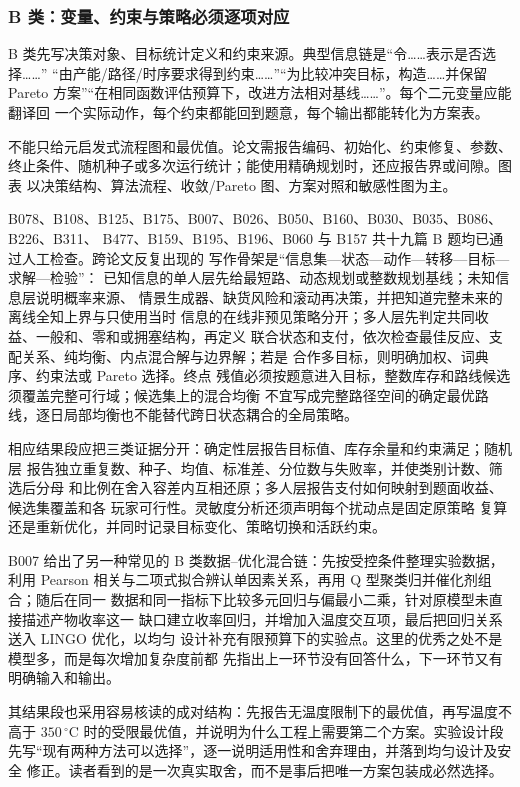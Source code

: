 \subsubsection{B 类：变量、约束与策略必须逐项对应}

B 类先写决策对象、目标统计定义和约束来源。典型信息链是“令……表示是否选择……”
“由产能/路径/时序要求得到约束……”“为比较冲突目标，构造……并保留 Pareto
方案”“在相同函数评估预算下，改进方法相对基线……”。每个二元变量应能翻译回
一个实际动作，每个约束都能回到题意，每个输出都能转化为方案表。

不能只给元启发式流程图和最优值。论文需报告编码、初始化、约束修复、参数、
终止条件、随机种子或多次运行统计；能使用精确规划时，还应报告界或间隙。图表
以决策结构、算法流程、收敛/Pareto 图、方案对照和敏感性图为主。

B078、B108、B125、B175、B007、B026、B050、B160、B030、B035、B086、B226、B311、
B477、B159、B195、B196、B060 与 B157 共十九篇 B 题均已通过人工检查。跨论文反复出现的
写作骨架是“信息集—状态—动作—转移—目标—求解—检验”：
已知信息的单人层先给最短路、动态规划或整数规划基线；未知信息层说明概率来源、
情景生成器、缺货风险和滚动再决策，并把知道完整未来的离线全知上界与只使用当时
信息的在线非预见策略分开；多人层先判定共同收益、一般和、零和或拥塞结构，再定义
联合状态和支付，依次检查最佳反应、支配关系、纯均衡、内点混合解与边界解；若是
合作多目标，则明确加权、词典序、约束法或 Pareto 选择。终点
残值必须按题意进入目标，整数库存和路线候选须覆盖完整可行域；候选集上的混合均衡
不宜写成完整路径空间的确定最优路线，逐日局部均衡也不能替代跨日状态耦合的全局策略。

相应结果段应把三类证据分开：确定性层报告目标值、库存余量和约束满足；随机层
报告独立重复数、种子、均值、标准差、分位数与失败率，并使类别计数、筛选后分母
和比例在舍入容差内互相还原；多人层报告支付如何映射到题面收益、候选集覆盖和各
玩家可行性。灵敏度分析还须声明每个扰动点是固定原策略
复算还是重新优化，并同时记录目标变化、策略切换和活跃约束。

B007 给出了另一种常见的 B 类数据--优化混合链：先按受控条件整理实验数据，利用
Pearson 相关与二项式拟合辨认单因素关系，再用 Q 型聚类归并催化剂组合；随后在同一
数据和同一指标下比较多元回归与偏最小二乘，针对原模型未直接描述产物收率这一
缺口建立收率回归，并增加入温度交互项，最后把回归关系送入 LINGO 优化，以均匀
设计补充有限预算下的实验点。这里的优秀之处不是模型多，而是每次增加复杂度前都
先指出上一环节没有回答什么，下一环节又有明确输入和输出。

其结果段也采用容易核读的成对结构：先报告无温度限制下的最优值，再写温度不高于
$350\,^{\circ}\mathrm{C}$ 时的受限最优值，并说明为什么工程上需要第二个方案。实验设计段
先写“现有两种方法可以选择”，逐一说明适用性和舍弃理由，并落到均匀设计及安全
修正。读者看到的是一次真实取舍，而不是事后把唯一方案包装成必然选择。

